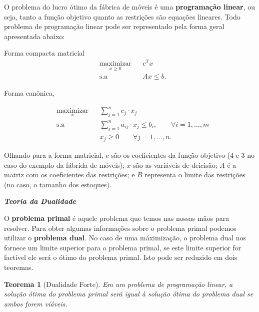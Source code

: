 O problema do lucro ótimo da fábrica de móveis é uma \textbf{programação linear}, ou seja, tanto a função objetivo quanto as restrições são equações lineares. Todo problema de programação linear pode ser representado pela forma geral apresentada abaixo:

Forma compacta matricial
\begin{equation*}
\begin{aligned}
& \underset{x\geq0}{\text{maximizar}}
& & c^{T}x \\
& \text{s.a}
& & Ax \leq b.
\end{aligned}
\end{equation*}

Forma canônica,

\begin{equation*}
\begin{aligned}
& \underset{x}{\text{maximizar}}
& & \sum_{j=1}^{n}c_{j}\cdot x_{j} \\
& \text{s.a}
& &\sum_{j=1}^{n}a_{ij}\cdot x_{j}\leq b_{i},\qquad\forall i=1,...,m\\
& & & x_j \geq0\qquad\forall j=1,...,n.
\end{aligned}
\end{equation*}

Olhando para a forma matricial, $c$ são os coeficientes da função objetivo (4 e 3 no caso do exemplo da fábrida de móveis); $x$ são as variáveis de deicisão; $A$ é a matriz com os coeficientes das restrições; e $B$ representa o limite das restrições (no caso, o tamanho dos estoques). 

\textbf{\textit{Teoria da Dualidade}}


O \textbf{problema primal} é aquele problema que temos nas nossas mãos para resolver. Para obter algumas informações sobre o problema primal podemos utilizar o \textbf{problema dual}. No caso de uma máximização, o problema dual nos fornece um limite superior para o problema primal, se este limite superior for factível ele será o ótimo do problema primal. Isto pode ser reduzido em dois teoremas. 

\newtheorem{teo}{Teorema}[section]
\begin{teo}[Dualidade Forte]
Em um problema de programação linear, a solução ótima do problema primal será igual à solução ótima do problema dual se ambos forem viáveis. 
\end{teo}

